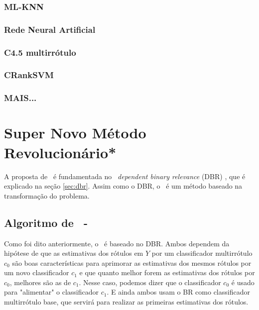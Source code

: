 \subsection{ML-KNN}
\subsection{Rede Neural Artificial}
\subsection{C4.5 multirrótulo}
\subsection{CRankSVM}
\subsection{MAIS...}


\chapter{Super Novo Método Revolucionário*}
A proposta de \MRLM~é fundamentada no \MML~\textit{dependent binary relevance} (DBR) \cite{dbr2014}, que é explicado
na seção \ref{sec:dbr}. Assim como o DBR, o \MRLMa~é um método baseado na transformação do problema.


\section{Algoritmo de \MRLM~-~\MRLMa}
Como foi dito anteriormente, o \MRLM~é baseado no DBR. 
Ambos dependem da hipótese de que as estimativas dos rótulos em $Y$ por um classificador multirrótulo $c_0$
são boas características para aprimorar as estimativas dos mesmos rótulos por um novo classificador $c_1$
e que quanto melhor forem as estimativas dos rótulos por $c_0$, melhores são as de $c_1$. Nesse caso, podemos dizer
que o classificador $c_0$ é usado para "alimentar" o classificador $c_1$.
E ainda ambos usam o BR como classificador multirrótulo base, que servirá para realizar as primeiras estimativas dos 
rótulos.

